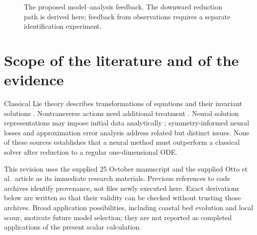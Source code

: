 \documentclass[11pt,a4paper,oneside]{report}
\numberwithin{equation}{chapter}
\begin{document}
\begin{figure}[htbp]\centering
{}
\caption{The proposed model--analysis feedback. The downward reduction path is derived here; feedback from observations requires a separate identification experiment.}\label{fig:feedback}
\end{figure}

\section{Scope of the literature and of the evidence}
Classical Lie theory describes transformations of equations and their invariant solutions \cite{olver,oliveri2026}. Nontransverse actions need additional treatment \cite{anderson2000}. Neural solution representations may impose initial data analytically \cite{lagaris}; symmetry-informed neural losses \cite{sympinn} and approximation error analysis \cite{mishra2023} address related but distinct issues. None of these sources establishes that a neural method must outperform a classical solver after reduction to a regular one-dimensional ODE.

This revision uses the supplied 25 October manuscript and the supplied Otto et al.\ article as its immediate research materials. Previous references to code archives identify provenance, not files newly executed here. Exact derivations below are written so that their validity can be checked without trusting those archives. Broad application possibilities, including coastal bed evolution and local scour, motivate future model selection; they are not reported as completed applications of the present scalar calculation.
\end{document}
